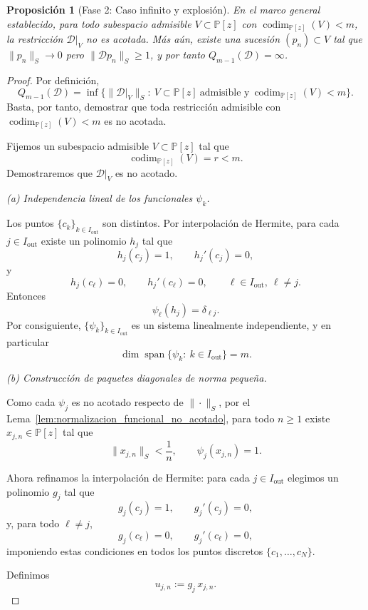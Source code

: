 \documentclass[12pt,a4paper]{article}
\newtheorem{proposition}{Proposición}
\theoremstyle{definition}
\theoremstyle{remark}
\newcommand{\Poly}{\mathbb{P}[z]}
\newcommand{\D}{\mathcal{D}}
\begin{document}
\begin{proposition}[Fase 2: Caso infinito y explosión]\label{prop:umbral_fase2}
  En el marco general establecido, para todo subespacio admisible $V\subset\Poly$ con $\operatorname{codim}_{\Poly}(V)<m$, la restricción $\D|_V$ no es acotada. Más aún, existe una sucesión $(p_n)\subset V$ tal que $\|p_n\|_S\to 0$ pero $\|\D p_n\|_S\ge 1$, y por tanto $Q_{m-1}(\D)=\infty$.
\end{proposition}

\begin{proof}
  Por definición,
  \[
    Q_{m-1}(\D)
    =
    \inf\{\|\D|_V\|_S:\ V\subset\Poly\ \text{admisible y}\ \operatorname{codim}_{\Poly}(V)<m\}.
  \]
  Basta, por tanto, demostrar que toda restricción admisible con
  $\operatorname{codim}_{\Poly}(V)<m$ es no acotada.

  Fijemos un subespacio admisible $V\subset \Poly$ tal que
  \[
    \operatorname{codim}_{\Poly}(V)=r<m.
  \]
  Demostraremos que $\D|_V$ es no acotado.

  \smallskip
  \noindent
  \emph{(a) Independencia lineal de los funcionales $\psi_k$.}

  Los puntos $\{c_k\}_{k\in I_{\mathrm{out}}}$ son distintos. Por interpolación de Hermite,
  para cada $j\in I_{\mathrm{out}}$ existe un polinomio $h_j$ tal que
  \[
    h_j(c_j)=1,\qquad h_j'(c_j)=0,
  \]
  y
  \[
    h_j(c_\ell)=0,\qquad h_j'(c_\ell)=0,
    \qquad \ell\in I_{\mathrm{out}},\ \ell\neq j.
  \]
  Entonces
  \[
    \psi_\ell(h_j)=\delta_{\ell j}.
  \]
  Por consiguiente, $\{\psi_k\}_{k\in I_{\mathrm{out}}}$ es un sistema linealmente independiente,
  y en particular
  \[
    \dim \operatorname{span}\{\psi_k:\ k\in I_{\mathrm{out}}\}=m.
  \]

  \smallskip
  \noindent
  \emph{(b) Construcción de paquetes diagonales de norma pequeña.}

  Como cada $\psi_j$ es no acotado respecto de $\|\cdot\|_S$, por el
  Lema~\ref{lem:normalizacion_funcional_no_acotado}, para todo $n\ge1$
  existe $x_{j,n}\in \Poly$ tal que
  \[
    \|x_{j,n}\|_S<\frac1n,
    \qquad
    \psi_j(x_{j,n})=1.
  \]

  Ahora refinamos la interpolación de Hermite: para cada $j\in I_{\mathrm{out}}$ elegimos
  un polinomio $g_j$ tal que
  \[
    g_j(c_j)=1,\qquad g_j'(c_j)=0,
  \]
  y, para todo $\ell\neq j$,
  \[
    g_j(c_\ell)=0,\qquad g_j'(c_\ell)=0,
  \]
  imponiendo estas condiciones en todos los puntos discretos
  $\{c_1,\dots,c_N\}$.

  Definimos
  \[
    u_{j,n}:=g_j\,x_{j,n}.
  \]


\end{proof}
\end{document}
